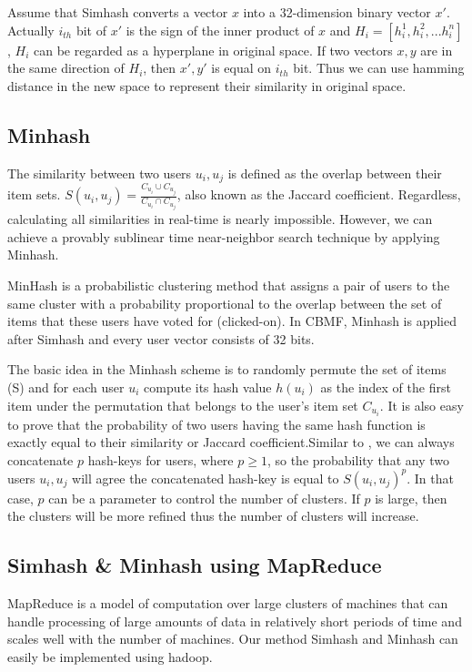 Assume that Simhash converts a vector $x$ into a 32-dimension binary vector $x'$. Actually $i_{th}$ bit of $x'$ is the sign of the inner product of $x$ and $H_i = [h^1_i, h^2_i,...h^n_i]$, $H_i$ can be regarded as a hyperplane in original space. If two vectors $x, y$ are in the same direction of $H_i$, then $x', y'$ is equal on $i_{th}$ bit. Thus we can use hamming distance in the new space to represent their similarity in original space.

\subsection{Minhash}

The similarity between two users $u_i , u_j$ is defined as the overlap between their item sets. $S(u_i, u_j) = \frac{C_{u_i} \cup C_{u_j}}{C_{u_i} \cap C_{u_j}}$, also known as the Jaccard coefficient. Regardless, calculating all similarities in real-time is nearly impossible. However, we can achieve a provably sublinear time near-neighbor search technique by applying Minhash.

MinHash is a probabilistic clustering method that assigns a pair of users to the same cluster with a probability proportional to the overlap between the set of items that these users have voted for (clicked-on). In CBMF, Minhash is applied after Simhash and every user vector consists of 32 bits. 

The basic idea in the Minhash scheme is to randomly permute the set of items (S) and for each user $u_i$ compute its hash value $h(u_i)$ as the index of the first item under the permutation that belongs to the user’s item set $C_{u_i}$. It is also easy to prove that the probability of two users having the same hash function is exactly equal to their similarity or Jaccard coefficient.Similar to \cite{Indyk:1998:ANN:276698.276876}, we can always concatenate $p$ hash-keys for
users, where $p \ge 1$, so the probability that any two users $u_i , u_j$ will agree the concatenated hash-key is equal to $S(u_i , u_j )^p$. In that case, $p$ can be a parameter to control the number of clusters. If $p$ is large, then the clusters will be more refined thus the number of clusters will increase.

\subsection{Simhash \& Minhash using MapReduce}

MapReduce is a model of computation over large clusters of machines that can handle processing of large amounts of data in relatively short periods of time and scales well with the number of machines. Our method Simhash and Minhash can easily be implemented using hadoop.

